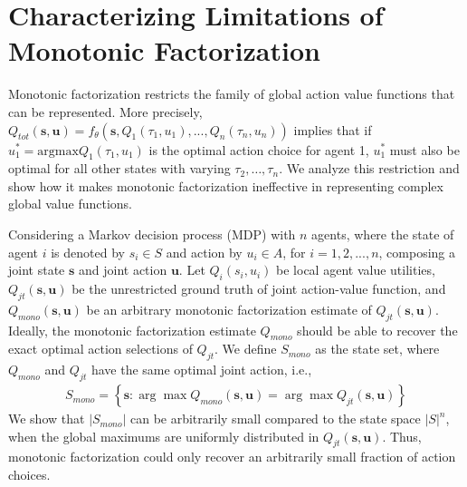 
\section{Characterizing Limitations of Monotonic Factorization}
Monotonic factorization restricts the family of global action value functions that can be represented. More precisely, 
$Q_{tot}(\mathbf{s}, \boldsymbol{u}) = f_\theta(\mathbf{s}, Q_1(\tau_1, u_1), ..., Q_n(\tau_n, u_n))$ implies that if $u_1^* = \text{argmax} Q_1(\tau_1, u_1)$ is the optimal action choice for agent 1, $u_1^*$ must also be optimal for all other states with varying $\tau_2,\ldots,\tau_n$. We analyze this restriction and show how it makes monotonic factorization ineffective in representing complex global value functions.


Considering a Markov decision process (MDP) with $n$ agents, where the state of agent $i$ is denoted by $s_i \in S$ and action by $u_i \in A$, for $i = 1, 2, ..., n$, composing a joint state $\textbf{s}$ and joint action $\textbf{u}$. Let $Q_i(s_i, u_i)$ be local agent value utilities, $Q_{jt}(\mathbf{s}, \textbf{u})$ be the unrestricted ground truth of joint action-value function, and $Q_{mono}(\mathbf{s}, \textbf{u})$ be an arbitrary monotonic factorization estimate of $Q_{jt}(\mathbf{s}, \textbf{u})$. Ideally, the monotonic factorization estimate $Q_{mono}$ should be able to recover the exact optimal action selections of $Q_{jt}$. We define $S_{mono}$ as the state set, where $Q_{mono}$ and $Q_{jt}$ have the same optimal joint action, i.e., 
\begin{eqnarray}
S_{mono}=\left\{ \mathbf{s}: \arg\max Q_{mono}(\mathbf{s}, \textbf{u}) = \arg\max  Q_{jt}(\mathbf{s}, \textbf{u}) \right\} \nonumber
\end{eqnarray}
We show that $|S_{mono}|$ can be arbitrarily small compared to the state space $|S|^n$, when the global maximums are uniformly distributed in  $Q_{jt}(\mathbf{s}, \textbf{u})$. Thus, monotonic factorization could only recover an arbitrarily small fraction of action choices.


